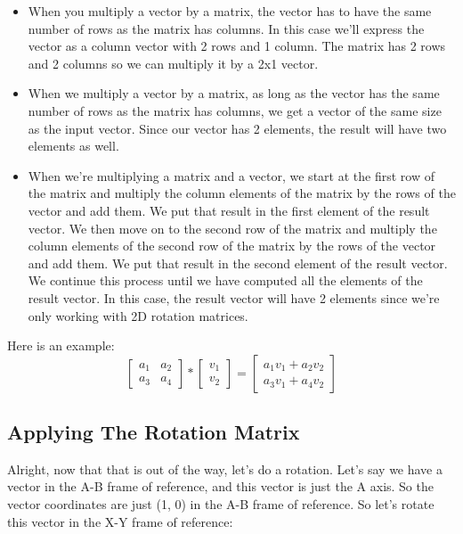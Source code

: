 \documentclass[11pt]{article}
\begin{document}
\begin{itemize}
    \item When you multiply a vector by a matrix, the vector has to have the same number
of rows as the matrix has columns.  In this case we’ll express the vector as a column vector
with 2 rows and 1 column.  The matrix has 2 rows and 2 columns so we can multiply it by a 2x1 vector.

    \item When we multiply a vector by a matrix, as long as the vector has the same number of rows 
    as the matrix has columns, we get a vector of the same size as the input vector.  Since our vector 
    has 2 elements, the result will have two elements as well.

    \item When we’re multiplying a matrix and a vector, we start at the first row of the matrix 
    and multiply the column elements of the matrix by the rows of the vector and add them.  We put that
    result in the first element of the result vector.  We then move on to the second row of the matrix
    and multiply the column elements of the second row of the matrix by the rows of the vector and add them.  We put that
    result in the second element of the result vector.  We continue this process until we have computed 
    all the elements of the result vector.  In this case, the result vector will have 2 elements since
    we're only working with 2D rotation matrices.
\end{itemize}

Here is an example:
\begin{equation}
\begin{bmatrix} a_1 & a_2 \\
a_3 & a_4 \end{bmatrix} * \begin{bmatrix} v_1 \\v_2 \end{bmatrix} = \begin{bmatrix} a_1 v_1 + a_2 v_2 \\
a_3 v_1 + a_4 v_2 \end{bmatrix}
\end{equation}

\subsection{Applying The Rotation Matrix}

Alright, now that that is out of the way, let’s do a rotation.  Let’s say we have a vector in the A-B 
frame of reference, and this vector is just the A axis.  So the vector coordinates are just (1, 0) 
in the A-B frame of reference.  So let’s rotate this vector in the X-Y frame of reference:
\end{document}
